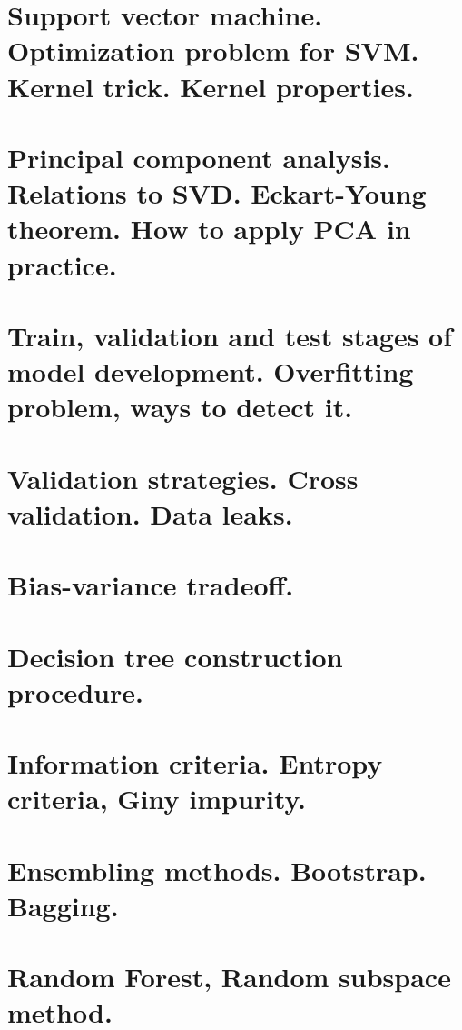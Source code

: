 \section{Support vector machine. Optimization problem for SVM. Kernel trick. Kernel properties.}


\section{Principal component analysis. Relations to SVD. Eckart-Young theorem. How to apply PCA in practice.}


\section{Train, validation and test stages of model development. Overfitting problem, ways to detect it.}


\section{Validation strategies. Cross validation. Data leaks.} 


\section{Bias-variance tradeoff.}


\section{Decision tree construction procedure.}


\section{Information criteria. Entropy criteria, Giny impurity.}


\section{Ensembling methods. Bootstrap. Bagging.}


\section{Random Forest, Random subspace method.}


